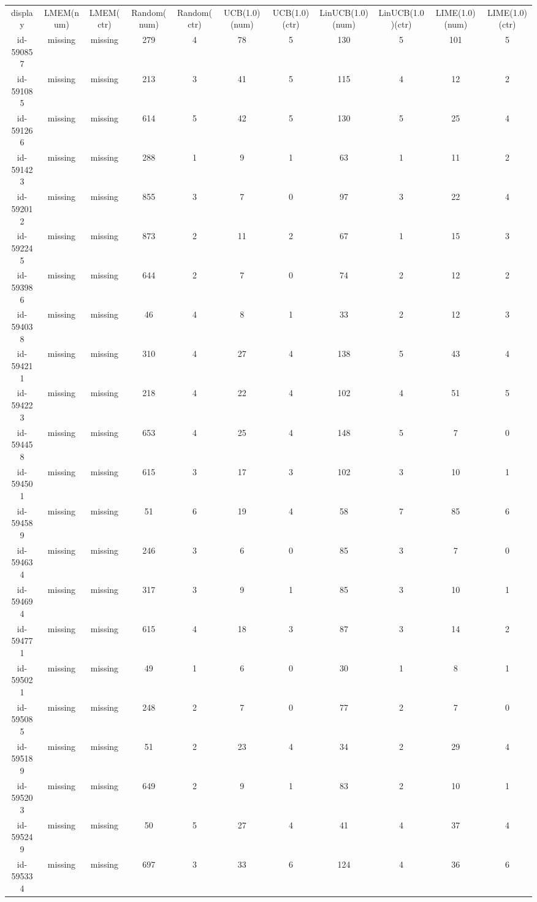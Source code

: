 \begin{tabular}{ccccccccccc}
display & LMEM(num) & LMEM(ctr) & Random(num) & Random(ctr) & UCB(1.0)(num) & UCB(1.0)(ctr) & LinUCB(1.0)(num) & LinUCB(1.0)(ctr) & LIME(1.0)(num) & LIME(1.0)(ctr)\\
id-590857 & missing & missing & 279 & 4 & 78 & 5 & 130 & 5 & 101 & 5\\
id-591085 & missing & missing & 213 & 3 & 41 & 5 & 115 & 4 & 12 & 2\\
id-591266 & missing & missing & 614 & 5 & 42 & 5 & 130 & 5 & 25 & 4\\
id-591423 & missing & missing & 288 & 1 & 9 & 1 & 63 & 1 & 11 & 2\\
id-592012 & missing & missing & 855 & 3 & 7 & 0 & 97 & 3 & 22 & 4\\
id-592245 & missing & missing & 873 & 2 & 11 & 2 & 67 & 1 & 15 & 3\\
id-593986 & missing & missing & 644 & 2 & 7 & 0 & 74 & 2 & 12 & 2\\
id-594038 & missing & missing & 46 & 4 & 8 & 1 & 33 & 2 & 12 & 3\\
id-594211 & missing & missing & 310 & 4 & 27 & 4 & 138 & 5 & 43 & 4\\
id-594223 & missing & missing & 218 & 4 & 22 & 4 & 102 & 4 & 51 & 5\\
id-594458 & missing & missing & 653 & 4 & 25 & 4 & 148 & 5 & 7 & 0\\
id-594501 & missing & missing & 615 & 3 & 17 & 3 & 102 & 3 & 10 & 1\\
id-594589 & missing & missing & 51 & 6 & 19 & 4 & 58 & 7 & 85 & 6\\
id-594634 & missing & missing & 246 & 3 & 6 & 0 & 85 & 3 & 7 & 0\\
id-594694 & missing & missing & 317 & 3 & 9 & 1 & 85 & 3 & 10 & 1\\
id-594771 & missing & missing & 615 & 4 & 18 & 3 & 87 & 3 & 14 & 2\\
id-595021 & missing & missing & 49 & 1 & 6 & 0 & 30 & 1 & 8 & 1\\
id-595085 & missing & missing & 248 & 2 & 7 & 0 & 77 & 2 & 7 & 0\\
id-595189 & missing & missing & 51 & 2 & 23 & 4 & 34 & 2 & 29 & 4\\
id-595203 & missing & missing & 649 & 2 & 9 & 1 & 83 & 2 & 10 & 1\\
id-595249 & missing & missing & 50 & 5 & 27 & 4 & 41 & 4 & 37 & 4\\
id-595334 & missing & missing & 697 & 3 & 33 & 6 & 124 & 4 & 36 & 6\\

\end{tabular}
